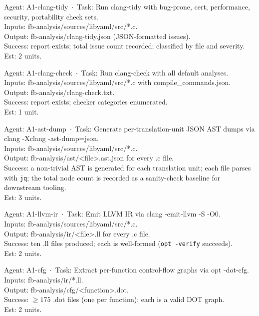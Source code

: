 \documentclass[12pt]{article}
\theoremstyle{definition}
\theoremstyle{remark}
\newenvironment{tasklist}{%
  \begingroup\raggedright
  \begin{description}[style=nextline, leftmargin=1.8cm, itemsep=0.4em]
}{%
  \end{description}
  \endgroup
}
\begin{document}
\begin{tasklist}

\item[T5.] {\ttfamily [~] Agent: A1-clang-tidy~$\cdot$~Task: Run clang-tidy with bug-prone, cert, performance, security, portability check sets.}\\
Inputs: fb-analysis/sources/libyaml/src/*.c.\\
Output: fb-analysis/clang-tidy.json (JSON-formatted issues).\\
Success: report exists; total issue count recorded; classified by file and severity.\\
Est: 2 units.

\item[T6.] {\ttfamily [~] Agent: A1-clang-check~$\cdot$~Task: Run clang-check with all default analyses.}\\
Inputs: fb-analysis/sources/libyaml/src/*.c with compile\_commands.json.\\
Output: fb-analysis/clang-check.txt.\\
Success: report exists; checker categories enumerated.\\
Est: 1 unit.

\item[T7.] {\ttfamily [~] Agent: A1-ast-dump~$\cdot$~Task: Generate per-translation-unit JSON AST dumps via clang -Xclang -ast-dump=json.}\\
Inputs: fb-analysis/sources/libyaml/src/*.c.\\
Output: fb-analysis/ast/<file>.ast.json for every .c file.\\
Success: a non-trivial AST is generated for each translation unit; each file parses with \verb|jq|; the total node count is recorded as a sanity-check baseline for downstream tooling.\\
Est: 3 units.

\item[T8.] {\ttfamily [~] Agent: A1-llvm-ir~$\cdot$~Task: Emit LLVM IR via clang -emit-llvm -S -O0.}\\
Inputs: fb-analysis/sources/libyaml/src/*.c.\\
Output: fb-analysis/ir/<file>.ll for every .c file.\\
Success: ten .ll files produced; each is well-formed (\verb|opt -verify| succeeds).\\
Est: 2 units.

\item[T9.] {\ttfamily [~] Agent: A1-cfg~$\cdot$~Task: Extract per-function control-flow graphs via opt -dot-cfg.}\\
Inputs: fb-analysis/ir/*.ll.\\
Output: fb-analysis/cfg/<function>.dot.\\
Success: $\geq 175$ .dot files (one per function); each is a valid DOT graph.\\
Est: 2 units.


\end{tasklist}
\end{document}
